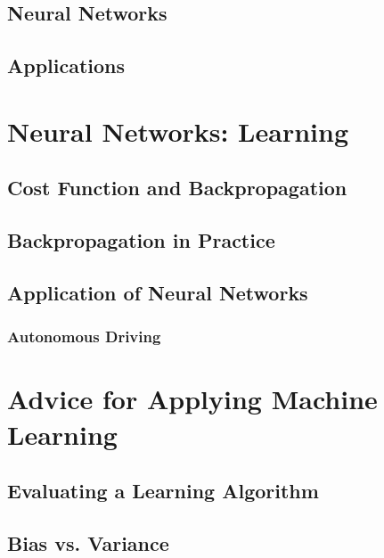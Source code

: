 \documentclass[11pt,a4paper]{article}
\begin{document}
    \subsection{Neural Networks}


    \subsection{Applications}




\newpage
\section{Neural Networks: Learning}

    \subsection{Cost Function and Backpropagation}


    \subsection{Backpropagation in Practice}


    \subsection{Application of Neural Networks}
    \subsubsection{Autonomous Driving}









\newpage
\section{Advice for Applying Machine Learning}
    \subsection{Evaluating a Learning Algorithm}
    \subsection{Bias vs. Variance}
\end{document}
